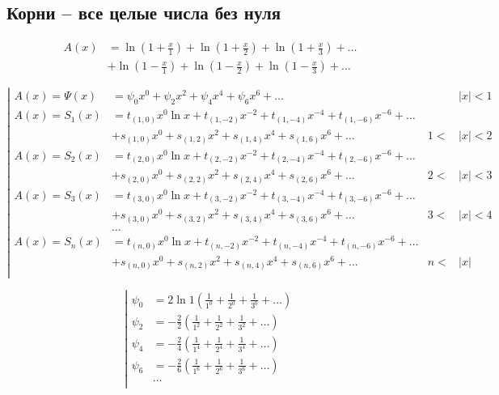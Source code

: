 
\subsection{Корни -- все целые числа без нуля}

\begin{equation*} \begin{aligned}
A(x) &=
  \ln{\left(1 + \frac{x}{1} \right)}
+ \ln{\left(1 + \frac{x}{2} \right)}
+ \ln{\left(1 + \frac{x}{3} \right)}
+ \ldots \\ &
+ \ln{\left(1 - \frac{x}{1} \right)}
+ \ln{\left(1 - \frac{x}{2} \right)}
+ \ln{\left(1 - \frac{x}{3} \right)}
+ \ldots
\end{aligned} \end{equation*}

\begin{equation*} \left| \begin{aligned}
A(x) = \Psi(x) &=
  \psi_0 x^0
+ \psi_2 x^2
+ \psi_4 x^4
+ \psi_6 x^6
+ \ldots &
&|x| < 1 \\
%
A(x) = S_1(x) &= 
  t_{(1,0)} x^0 \ln{x}
+ t_{(1,-2)} x^{-2}
+ t_{(1,-4)} x^{-4}
+ t_{(1,-6)} x^{-6}
+ \ldots \\ &
+ s_{(1,0)} x^0
+ s_{(1,2)} x^2
+ s_{(1,4)} x^4
+ s_{(1,6)} x^6
+ \ldots &
1 < &|x| < 2 \\
%
A(x) = S_2(x) &= 
  t_{(2,0)} x^0 \ln{x}
+ t_{(2,-2)} x^{-2}
+ t_{(2,-4)} x^{-4}
+ t_{(2,-6)} x^{-6}
+ \ldots \\ &
+ s_{(2,0)} x^0
+ s_{(2,2)} x^2
+ s_{(2,4)} x^4
+ s_{(2,6)} x^6
+ \ldots &
2 < &|x| < 3 \\
%
A(x) = S_3(x) &= 
  t_{(3,0)} x^0 \ln{x}
+ t_{(3,-2)} x^{-2}
+ t_{(3,-4)} x^{-4}
+ t_{(3,-6)} x^{-6}
+ \ldots \\ &
+ s_{(3,0)} x^0
+ s_{(3,2)} x^2
+ s_{(3,4)} x^4
+ s_{(3,6)} x^6
+ \ldots &
3 < &|x| < 4 \\
%
&\ldots \\
%
A(x) = S_n(x) &= 
  t_{(n,0)} x^0 \ln{x}
+ t_{(n,-2)} x^{-2}
+ t_{(n,-4)} x^{-4}
+ t_{(n,-6)} x^{-6}
+ \ldots \\ &
+ s_{(n,0)} x^0
+ s_{(n,2)} x^2
+ s_{(n,4)} x^4
+ s_{(n,6)} x^6
+ \ldots &
n < &|x| \\
\end{aligned} \right. \end{equation*}

\begin{equation*} \left| \begin{aligned}
\psi_0 &= 2 \ln{1}
  \left(
  \frac{1}{1^0}
+ \frac{1}{2^0}
+ \frac{1}{3^0}
+ \ldots
  \right) \\
%
\psi_2 &=
- \frac{2}{2}
  \left(
  \frac{1}{1^2}
+ \frac{1}{2^2}
+ \frac{1}{3^2}
+ \ldots
  \right) \\
%
\psi_4 &=
- \frac{2}{4}
  \left(
  \frac{1}{1^4}
+ \frac{1}{2^4}
+ \frac{1}{3^4}
+ \ldots
  \right) \\
%
\psi_6 &=
- \frac{2}{6}
  \left(
  \frac{1}{1^6}
+ \frac{1}{2^6}
+ \frac{1}{3^6}
+ \ldots
  \right) \\
%
&\ldots \\
\end{aligned} \right. \end{equation*}

